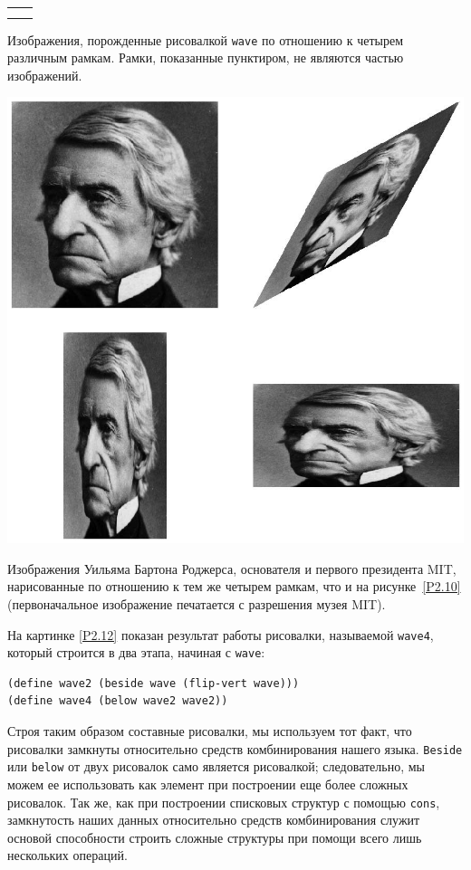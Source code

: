 \begin{cntrfig}
\begin{tabular}{cc}
 &  \\
 & 
\end{tabular}
\caption{Изображения, порожденные рисовалкой
{\tt wave} по отношению к четырем различным рамкам.  Рамки,
показанные пунктиром, не являются частью изображений.}
\label{P2.10}

\end{cntrfig}

\begin{cntrfig}%
\includegraphics{xfig-mod/2-11.eps}
\caption{Изображения Уильяма Бартона Роджерса, основателя и первого президента MIT,
нарисованные по отношению к тем же четырем рамкам, что и на 
рисунке~\ref{P2.10} (первоначальное изображение печатается с
разрешения музея MIT).}
\label{P2.11}
\end{cntrfig}

На картинке \ref{P2.12} показан результат
работы рисовалки, называемой {\tt wave4}, который строится в
два этапа, начиная с {\tt wave}:

\begin{Verbatim}[fontsize=\small]
(define wave2 (beside wave (flip-vert wave)))
(define wave4 (below wave2 wave2))
\end{Verbatim}
Строя таким образом составные рисовалки, мы используем тот факт, что
рисовалки замкнуты относительно средств комбинирования нашего
языка. {\tt Beside} или {\tt below} от двух рисовалок
само является рисовалкой; следовательно, мы можем ее использовать как
элемент при построении еще более сложных рисовалок.  Так же, как при
построении списковых структур с помощью {\tt cons}, замкнутость 
наших данных относительно средств комбинирования служит основой
способности строить сложные структуры при помощи всего лишь нескольких 
операций.

